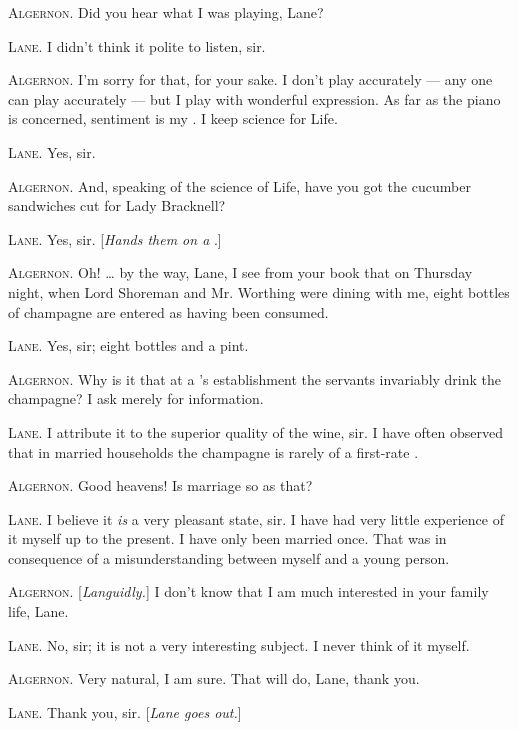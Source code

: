 \documentclass{fiche}
\begin{document}
\begin{texte}
\textsc{Algernon.} Did you hear what I was playing, Lane?

\textsc{Lane.} I didn't think it polite to listen, sir.

\textsc{Algernon.} I'm sorry for that, for your sake. I don't play accurately --- any one can
play accurately --- but I play with wonderful expression. As far as the piano is concerned,
sentiment is my . I keep science for Life.

\textsc{Lane.} Yes, sir.

\textsc{Algernon.} And, speaking of the science of Life, have you got the cucumber sandwiches
cut for Lady Bracknell?

\textsc{Lane.} Yes, sir. [\emph{Hands them on a} .]

\textsc{Algernon.} Oh! \ldots{} by the way, Lane, I see from your book that on Thursday night,
when Lord Shoreman and Mr. Worthing were dining with me, eight bottles of champagne are
entered as having been consumed.

\textsc{Lane.} Yes, sir; eight bottles and a pint.

\textsc{Algernon.} Why is it that at a 's
establishment the servants invariably drink the champagne? I ask merely for information.

\textsc{Lane.} I attribute it to the superior quality of the wine, sir. I have often observed
that in married households the champagne is rarely of a first-rate
.

\textsc{Algernon.} Good heavens! Is marriage so
 as that?

\textsc{Lane.} I believe it \emph{is} a very pleasant state, sir. I have had very little
experience of it myself up to the present. I have only been married once. That was in
consequence of a misunderstanding between myself and a young person.

\textsc{Algernon.} [\emph{Languidly.}] I don't know that I am much interested in your family
life, Lane.

\textsc{Lane.} No, sir; it is not a very interesting subject. I never think of it myself.

\textsc{Algernon.} Very natural, I am sure. That will do, Lane, thank you.

\textsc{Lane.} Thank you, sir. [\emph{Lane goes out.}]


\end{texte}
\end{document}
